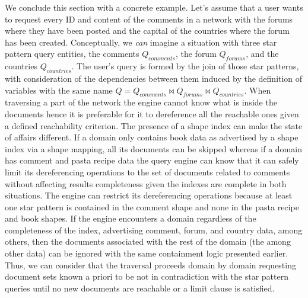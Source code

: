 We conclude this section with a concrete example.
Let's assume that a user wants to request every ID and content of the comments in a network with the forums where they have been posted and the capital of the countries where the forum has been created.
Conceptually, we \emph{can} imagine a situation with three star pattern query entities, the comments $ Q_{comments}$, the forum $Q_{forums}$, and the countries $Q_{countries}$.
The user's query is formed by the join of those star patterns, with consideration of the dependencies between them induced by the definition of variables with the same name $Q = Q_{comments} \bowtie Q_{forums} \bowtie Q_{countries}$. 
When traversing a part of the network the engine cannot know what is inside the documents hence it is preferable for it to dereference all the reachable ones given a defined reachability criterion.
The presence of a shape index can make the state of affairs different.
If a domain only contains book data as advertised by a shape index via a shape mapping, all its documents can be skipped 
whereas if a domain has comment and pasta recipe data the query engine can know that it can safely limit its dereferencing operations to the set of documents related to comments without affecting results completeness given the indexes are complete in both situations.
The engine can restrict its dereferencing operations because at least one star pattern is contained in the comment shape and none in the pasta recipe and book shapes.
If the engine encounters a domain regardless of the completeness of the index, advertising comment, forum, and country data, among others, then the documents associated with the rest of the domain (the among other data) can be ignored with the same containment logic presented earlier.
Thus, we can consider that the traversal proceeds domain by domain requesting document sets known a priori to be not in contradiction with the star pattern queries until no new documents are reachable or a limit clause is satisfied.
